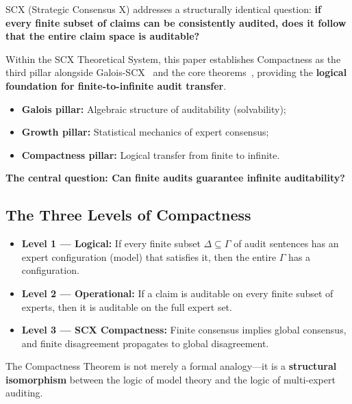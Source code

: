 \documentclass[12pt,a4paper]{article}
\theoremstyle{remark}
\begin{document}
SCX (Strategic Consensus X) addresses a structurally identical question: \textbf{if every finite subset of claims can be consistently audited, does it follow that the entire claim space is auditable?}

Within the SCX Theoretical System, this paper establishes Compactness as the third pillar alongside Galois-SCX~\cite{scx_galois} and the core theorems~\cite{scx2026theorems}, providing the \textbf{logical foundation for finite-to-infinite audit transfer}.

\begin{itemize}[itemsep=3pt]
    \item \textbf{Galois pillar:} Algebraic structure of auditability (solvability);
    \item \textbf{Growth pillar:} Statistical mechanics of expert consensus;
    \item \textbf{Compactness pillar:} Logical transfer from finite to infinite.
\end{itemize}

\begin{center}
\textbf{The central question: Can finite audits guarantee infinite auditability?}
\end{center}

\subsection{The Three Levels of Compactness}
\begin{itemize}[itemsep=4pt]
    \item \textbf{Level 1 --- Logical:} If every finite subset \(\Delta \subseteq \Gamma\) of audit sentences has an expert configuration (model) that satisfies it, then the entire \(\Gamma\) has a configuration.
    \item \textbf{Level 2 --- Operational:} If a claim is auditable on every finite subset of experts, then it is auditable on the full expert set.
    \item \textbf{Level 3 --- SCX Compactness:} Finite consensus implies global consensus, and finite disagreement propagates to global disagreement.
\end{itemize}

The Compactness Theorem is not merely a formal analogy---it is a \textbf{structural isomorphism} between the logic of model theory and the logic of multi-expert auditing.
\end{document}
